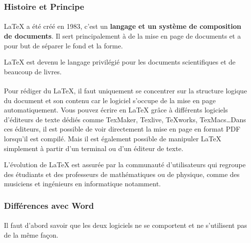 \subsubsection*{Histoire et Principe}

\paragraph{} \LaTeX{} a été créé en 1983, c'est un \textbf{langage et un
système de composition de documents}. Il sert principalement à de la mise en
page de documents et a pour but de séparer le fond et la forme.

\LaTeX{} est devenu le langage privilégié pour les documents scientifiques et
de beaucoup de livres.

\paragraph{} Pour rédiger du \LaTeX, il faut uniquement se concentrer sur la
structure logique du document et son contenu car le logiciel s'occupe de la
mise en page automatiquement. Vous pouvez écrire en \LaTeX{} grâce à différents
logiciels d’éditeurs de texte dédiés comme TexMaker, Texlive, TeXworks,
TexMacs\ldots Dans ces éditeurs, il est possible de voir directement la mise en
page en format PDF lorsqu'il est compilé. Mais il est également possible de
manipuler \LaTeX{} simplement à partir d'un terminal ou d'un éditeur de texte.

L'évolution de \LaTeX{} est assurée par la communauté d'utilisateurs qui
regroupe des étudiants et des professeurs de mathématiques ou de physique,
comme des musiciens et ingénieurs en informatique notamment.

\subsubsection*{Différences avec Word}

\paragraph{} Il faut d'abord savoir que les deux logiciels ne se comportent et
ne s'utilisent pas de la même façon.

